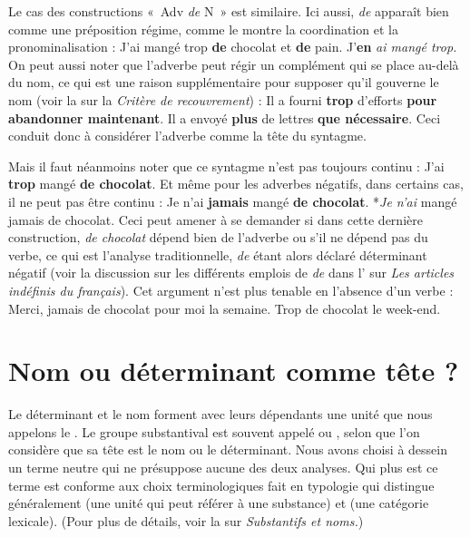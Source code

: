 {    Le cas des constructions «~Adv \textit{de} N~» est similaire. Ici aussi, \textit{de} apparaît bien comme une préposition régime, comme le montre la coordination et la pronominalisation :
    \ea
        {J’ai mangé trop} \textbf{{de} } {chocolat et} \textbf{{de}}  {pain.}
    \z
    \ea
        {J’}\textbf{{en}} \textit{ai mangé trop.}
    \z
    On peut aussi noter que l’adverbe peut régir un complément qui se place au-delà du nom, ce qui est une raison supplémentaire pour supposer qu’il gouverne le nom (voir la  sur la \textit{Critère de recouvrement}) :
    \ea
        {Il a fourni} \textbf{{trop}}  {d’efforts} \textbf{{pour abandonner maintenant}}.
    \z
    \ea
        {Il a envoyé} \textbf{{plus}}  {de lettres} \textbf{{que nécessaire}}.
    \z
    Ceci conduit donc à considérer l’adverbe comme la tête du syntagme.

    \ea
    \z

    Mais il faut néanmoins noter que ce syntagme n’est pas toujours continu :
    \ea
        {J’ai} \textbf{{trop}}  {mangé} \textbf{{de chocolat}}.
    \z
    Et même pour les adverbes négatifs, dans certains cas, il ne peut pas être continu :
    \ea
        {Je n’ai} \textbf{{jamais}}  {mangé} \textbf{{de chocolat}}.
    \z
    \ea
        *\textit{Je n’ai}  {mangé jamais de chocolat}.
    \z
    Ceci peut amener à se demander si dans cette dernière construction, \textit{de chocolat} dépend bien de l’adverbe ou s’il ne dépend pas du verbe, ce qui est l’analyse traditionnelle, \textit{de} étant alors déclaré déterminant négatif (voir la discussion sur les différents emplois de \textit{de} dans l’ sur \textit{Les articles indéfinis du français}). Cet argument n’est plus tenable en l’absence d’un verbe :
    \ea
        {Merci,} {jamais de chocolat pour moi la semaine.} {Trop de chocolat le week-end.}
    \z
}
\section{Nom ou déterminant comme tête ?}\label{sec:3.3.23}

Le déterminant et le nom forment avec leurs dépendants une unité que nous appelons le . Le groupe substantival est souvent appelé  ou , selon que l’on considère que sa tête est le nom ou le déterminant. Nous avons choisi à dessein un terme neutre qui ne présuppose aucune des deux analyses. Qui plus est ce terme est conforme aux choix terminologiques fait en typologie qui distingue généralement  (une unité qui peut référer à une substance) et  (une catégorie lexicale). (Pour plus de détails, voir la  sur \textit{Substantifs et noms.})

